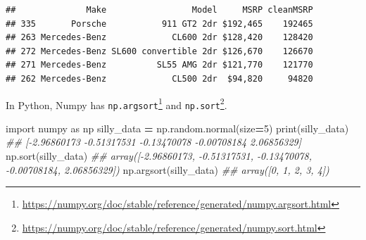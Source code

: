 \documentclass[
  12pt,
]{krantz}
\makeatletter
\newenvironment{Shaded}{\begin{snugshade}}{\end{snugshade}}
\newcommand{\AttributeTok}[1]{\textcolor[rgb]{0.61,0.61,0.61}{#1}}
\newcommand{\BuiltInTok}[1]{#1}
\newcommand{\CommentTok}[1]{\textcolor[rgb]{0.37,0.37,0.37}{\textit{#1}}}
\newcommand{\ConstantTok}[1]{\textcolor[rgb]{0,0,0}{#1}}
\newcommand{\DecValTok}[1]{\textcolor[rgb]{0.06,0.06,0.06}{#1}}
\newcommand{\FunctionTok}[1]{\textcolor[rgb]{0,0,0}{#1}}
\newcommand{\ImportTok}[1]{#1}
\newcommand{\NormalTok}[1]{#1}
\newcommand{\OperatorTok}[1]{\textcolor[rgb]{0.43,0.43,0.43}{\textbf{#1}}}
\newcommand{\OtherTok}[1]{\textcolor[rgb]{0.37,0.37,0.37}{#1}}
\newcommand{\SpecialCharTok}[1]{\textcolor[rgb]{0,0,0}{#1}}
\newcommand{\StringTok}[1]{\textcolor[rgb]{0.5,0.5,0.5}{#1}}
\renewcommand{\href}[2]{#2\footnote{\url{#1}}}
\newenvironment{kframe}{%
\medskip{}
\setlength{\fboxsep}{.8em}
 \def\at@end@of@kframe{}%
 \ifinner\ifhmode%
  \def\at@end@of@kframe{\end{minipage}}%
  \begin{minipage}{\columnwidth}%
 \fi\fi%
 \def\FrameCommand##1{\hskip\@totalleftmargin \hskip-\fboxsep
 \colorbox{shadecolor}{##1}\hskip-\fboxsep
     \hskip-\linewidth \hskip-\@totalleftmargin \hskip\columnwidth}%
 \MakeFramed {\advance\hsize-\width
   \@totalleftmargin\z@ \linewidth\hsize
   \@setminipage}}%
 {\par\unskip\endMakeFramed%
 \at@end@of@kframe}
\renewenvironment{Shaded}{\begin{kframe}}{\end{kframe}}
\makeatother
\begin{document}
\begin{Shaded}
\end{Shaded}

\begin{verbatim}
##              Make                 Model     MSRP cleanMSRP
## 335       Porsche           911 GT2 2dr $192,465    192465
## 263 Mercedes-Benz             CL600 2dr $128,420    128420
## 272 Mercedes-Benz SL600 convertible 2dr $126,670    126670
## 271 Mercedes-Benz          SL55 AMG 2dr $121,770    121770
## 262 Mercedes-Benz             CL500 2dr  $94,820     94820
\end{verbatim}

In Python, Numpy has \href{https://numpy.org/doc/stable/reference/generated/numpy.argsort.html}{\texttt{np.argsort}} and \href{https://numpy.org/doc/stable/reference/generated/numpy.sort.html}{\texttt{np.sort}}.

\begin{Shaded}
\begin{Highlighting}[]
\ImportTok{import}\NormalTok{ numpy }\ImportTok{as}\NormalTok{ np}
\NormalTok{silly\_data }\OperatorTok{=}\NormalTok{ np.random.normal(size}\OperatorTok{=}\DecValTok{5}\NormalTok{)}
\BuiltInTok{print}\NormalTok{(silly\_data)}
\CommentTok{\#\# [{-}2.96860173 {-}0.51317531 {-}0.13470078 {-}0.00708184  2.06856329]}
\NormalTok{np.sort(silly\_data)}
\CommentTok{\#\# array([{-}2.96860173, {-}0.51317531, {-}0.13470078, {-}0.00708184,  2.06856329])}
\NormalTok{np.argsort(silly\_data)}
\CommentTok{\#\# array([0, 1, 2, 3, 4])}
\end{Highlighting}
\end{Shaded}
\end{document}
